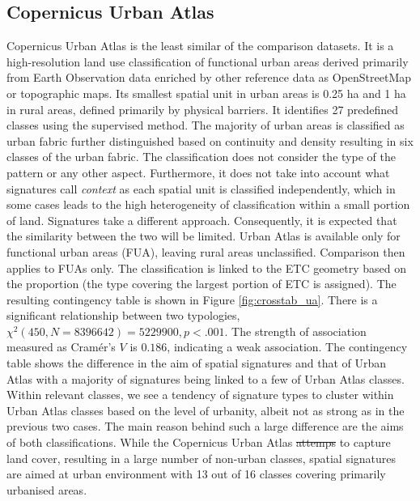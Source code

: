 \documentclass[fleqn,10pt]{wlscirep}
\providecommand{\DIFadd}[1]{{\protect\color{blue}\uwave{#1}}} %
\providecommand{\DIFdel}[1]{{\protect\color{red}\sout{#1}}}                      %
\providecommand{\DIFaddbegin}{} %
\providecommand{\DIFaddend}{} %
\providecommand{\DIFdelbegin}{} %
\providecommand{\DIFdelend}{} %
\begin{document}
\subsection*{Copernicus Urban Atlas}
Copernicus Urban Atlas is the least similar of the comparison datasets. It is a
high-resolution land use classification of functional urban areas derived primarily from
Earth Observation data enriched by other reference data as OpenStreetMap or topographic
maps. Its smallest spatial unit in urban areas is 0.25 ha and 1 ha in rural areas,
defined primarily by physical barriers. It identifies
27 predefined classes using the supervised method.
The majority of urban areas is classified as urban fabric further distinguished based on
continuity and density resulting in six classes of the urban fabric. The classification does
not consider the type of the pattern or any other aspect. Furthermore, it does not take
into account what signatures call \textit{context} as each spatial unit is
classified independently, which in some cases leads to the high heterogeneity of
classification within a small portion of land. Signatures take a different approach.
Consequently, it is expected that the similarity between the two will be limited.
Urban Atlas is available only for functional urban areas (FUA), leaving rural areas
unclassified. Comparison then applies to FUAs only. The classification is linked to the
ETC geometry based on the proportion (the type covering the largest portion of ETC is
assigned). The resulting contingency table is shown in Figure \ref{fig:crosstab_ua}. There is a
significant relationship between two typologies, $\chi^{2} (450, N = 8396642) = 5229900,
p < .001$. The strength of association measured as Cramér's $V$ is $0.186$, indicating
a weak association. The contingency table shows the difference in the aim of spatial
signatures and that of Urban Atlas with a majority of signatures being linked to a few
of Urban Atlas classes. Within relevant classes, we see a tendency of signature types to
cluster within Urban Atlas classes based on the level of urbanity, albeit not as strong
as in the previous two cases.
The main reason behind such a large difference are the aims of both classifications. While
the Copernicus Urban Atlas \DIFdelbegin \DIFdel{attemps }\DIFdelend \DIFaddbegin \DIFadd{attempts }\DIFaddend to capture land cover, resulting in a large number
of non-urban classes, spatial signatures are aimed at urban environment with 13 out of 16
classes covering primarily urbanised areas.
\end{document}

